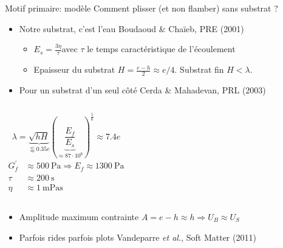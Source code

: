 \documentclass{beamer}
\begin{document}
\begin{frame}{Motif primaire: modèle}
Comment plisser (et non flamber) sans substrat ?
\begin{itemize}
\item Notre substrat, c'est l'eau
\hfill {\footnotesize Boudaoud \& Chaïeb, PRE (2001)}
\begin{itemize}
\item $E_s = \frac{3\eta}{\tau}$\qquad avec $\tau$ le temps caractéristique de l'écoulement
\item Epaisseur du substrat $H = \frac{e-h}{2} \approx e/4$. Substrat fin $H<\lambda$.
\end{itemize}
\item Pour un substrat d'un seul côté \hfill{\footnotesize Cerda \& Mahadevan, PRL (2003)} 
\end{itemize}
\begin{columns}
\[
\lambda = \underbrace{\sqrt{hH}}_{\lessapprox 0.35e} \left(\underbrace{\frac{E_f}{E_s}}_{\approx 87\cdot 10^6}\right)^\frac{1}{6}
\approx 7.4e
\]
\begin{align*}
G^\prime_f &\approx \SI{500}{\pascal}\Rightarrow
E_f \approx \SI{1300}{\pascal}\\
\tau &\approx \SI{200}{\second}\\
\eta &\approx \SI{1}{\milli\pascal\second}
\end{align*}
\end{columns}
\vfill
\begin{itemize}
\item Amplitude maximum contrainte $A=e-h\approx h\Rightarrow U_B \approx U_S$ \item Parfois rides parfois plots 
\hfill {\footnotesize Vandeparre \textit{et al.}, Soft Matter (2011)}
\end{itemize}
\end{frame}
\end{document}
